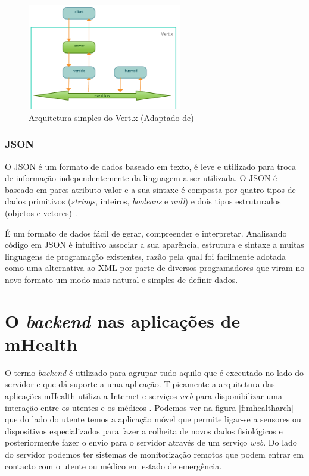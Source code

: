 \begin{figure}[H]
  \centering
  \includegraphics[width=0.6\textwidth]{imgs/vertx_arch.png}
  \caption[Arquitetura simples do Vert.x]{Arquitetura simples do Vert.x (Adaptado de\cite{vertx-study})}
  \label{f:vertxarch}
\end{figure}


\subsubsection{JSON}
O \gls{JSON} é um formato de dados baseado em texto, é leve e utilizado para troca de informação independentemente da linguagem a ser utilizada. O \gls{JSON} é baseado em pares atributo-valor e a sua sintaxe é composta por quatro tipos de dados primitivos (\textit{strings}, inteiros, \textit{booleans} e \textit{null}) e dois tipos estruturados (objetos e vetores) \cite{json}. 
\par
É um formato de dados  fácil de gerar, compreender e interpretar. Analisando código em \gls{JSON} é intuitivo associar a sua aparência, estrutura e sintaxe a muitas linguagens de programação existentes, razão pela qual foi facilmente adotada como uma alternativa ao \gls{XML} por parte de diversos programadores que viram no novo formato um modo mais natural e simples de definir dados.



\newpage
\section{O \textit{backend} nas aplicações de mHealth}
O termo \textit{backend} é utilizado para agrupar tudo aquilo que é executado no lado do servidor e que dá suporte a uma aplicação. Tipicamente a arquitetura das aplica\c c\~oes mHealth utiliza a Internet e serviços \textit{web} para disponibilizar uma intera\c c\~ao entre os utentes e os m\'edicos \cite{mhealth}. Podemos ver na figura \ref{f:mhealtharch} que do lado do utente temos a aplicação móvel que permite ligar-se a sensores ou dispositivos especializados para fazer a colheita de novos dados fisiológicos e posteriormente fazer o envio para o servidor através de um serviço \textit{web}. Do lado do servidor podemos ter sistemas de monitorização remotos que podem entrar em contacto com o utente ou médico em estado de emergência.

